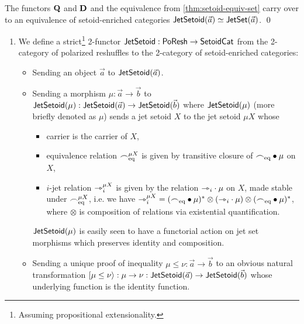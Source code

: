 \documentclass[a4paper]{memoir}
\begin{document}
\begin{corollary} \label{thm:jetsetoid-equiv-jetset}
	The functors ${\mathbf{Q}}$ and ${\mathbf{D}}$ and the equivalence from \cref{thm:setoid-equiv-set} carry over to an equivalence of setoid-enriched categories $\mathsf{JetSetoid}(\vec a) \simeq \mathsf{JetSet}(\vec a)$. \qed
\end{corollary}
\begin{definition}
	\label{def:poresh-jetsetoid}
	\label{def:poresh-jetset}
	\begin{enumerate}
		\item We define a strict\footnote{Assuming propositional extensionality.} 2-functor $\mathsf{JetSetoid} : \mathsf{PoResh} \to {\mathsf{Setoid}}{\mathsf{Cat}}$ from the 2-category of polarized reshuffles to the 2-category of setoid-enriched categories:
		\begin{itemize}
			\item Sending an object $\vec a$ to $\mathsf{JetSetoid}(\vec a)$.
			\item Sending a morphism $\mu : \vec a \to \vec b$ to $\mathsf{JetSetoid}(\mu) : \mathsf{JetSetoid}(\vec a) \to \mathsf{JetSetoid}(\vec b)$ where $\mathsf{JetSetoid}(\mu)$ (more briefly denoted as $\mu$) sends a jet setoid $X$ to the jet setoid $\mu X$ whose
			\begin{itemize}
				\item carrier is the carrier of $X$,
				\item equivalence relation ${\frown}_{{\mathrm{eq}}}^{\mu X}$ is given by transitive closure of ${\frown}_{{\mathrm{eq}}} \mathbin{\bullet} \mu$ on $X$,
				\item $i$-jet relation ${\rightarrowtriangle}_i^{\mu X}$ is given by the relation ${\rightarrowtriangle}_i \cdot \mu$ on $X$, made stable under ${\frown}_{{\mathrm{eq}}}^{\mu X}$, i.e. we have
				${\rightarrowtriangle}_i^{\mu X} = ({\frown}_{{\mathrm{eq}}} \mathbin{\bullet} \mu)^* \otimes ({\rightarrowtriangle}_i \cdot \mu) \otimes ({\frown}_{{\mathrm{eq}}} \mathbin{\bullet} \mu)^*$, where $\otimes$ is composition of relations via existential quantification.
			\end{itemize}
			$\mathsf{JetSetoid}(\mu)$ is easily seen to have a functorial action on jet set morphisms which preserves identity and composition.
			\item Sending a unique proof of inequality $\mu \leq \nu : \vec a \to \vec b$ to an obvious natural transformation $\mathopen{}\left[ \mu \leq \nu \right\rangle\mathclose{} : \mu \to \nu : \mathsf{JetSetoid}(\vec a) \to \mathsf{JetSetoid}(\vec b)$ whose underlying function is the identity function.
		\end{itemize}
		

\end{enumerate}
\end{definition}
\end{document}
